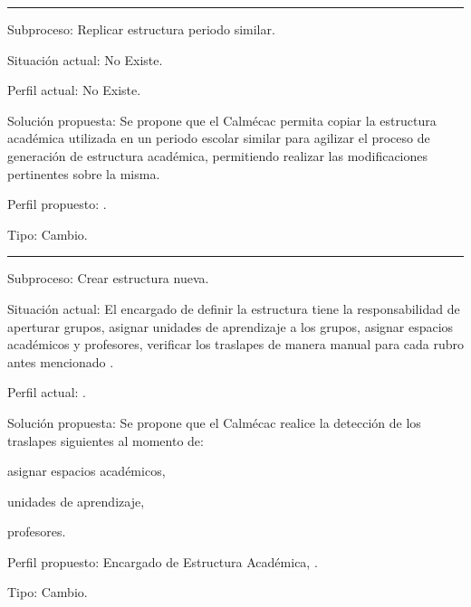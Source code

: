 \hrule
\vspace{0.2cm}
\begin{Cdescription}
	\item[Subproceso:] Replicar estructura periodo similar.
	\item[Situación actual:] No Existe.
	\item[Perfil actual:] No Existe.
	\item[Solución propuesta:] Se propone que el Calmécac permita copiar la estructura académica utilizada en un periodo escolar similar para agilizar el proceso de generación de estructura académica, permitiendo realizar las modificaciones pertinentes sobre la misma.
	\item[Perfil propuesto:] .
	\item[Tipo:] Cambio.
\end{Cdescription}

\hrule
\vspace{0.2cm}
\begin{Cdescription}
	\item[Subproceso:] Crear estructura nueva.
	\item[Situación actual:] El encargado de definir la estructura tiene la responsabilidad de aperturar grupos, asignar unidades de aprendizaje a los grupos, asignar espacios académicos y profesores, verificar los traslapes de manera manual para cada rubro antes mencionado	.
	\item[Perfil actual:].
	\item[Solución propuesta:] Se propone que el Calmécac realice la detección de los traslapes siguientes al momento de:
	\begin{Citemize}
		\item asignar espacios académicos, 
		\item unidades de aprendizaje, 
		\item profesores.
	\end{Citemize}
	\item[Perfil propuesto:] Encargado de Estructura Académica, .
	\item[Tipo:] Cambio.
\end{Cdescription}

